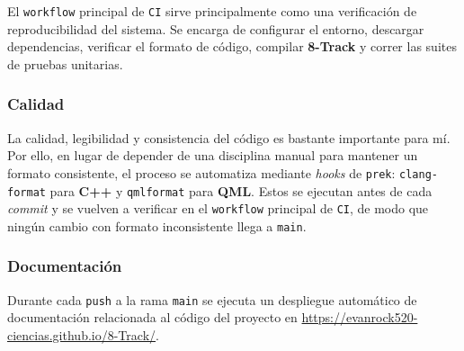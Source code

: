 El \texttt{workflow} principal de \texttt{CI} sirve principalmente como una verificación de reproducibilidad
del sistema. Se encarga de configurar el entorno, descargar dependencias, verificar el formato de código,
compilar \textbf{8-Track} y correr las suites de pruebas unitarias.

\subsubsection*{Calidad}

La calidad, legibilidad y consistencia del código es bastante importante para mí.
Por ello, en lugar de depender de una disciplina manual para mantener un formato consistente, el proceso
se automatiza mediante \textit{hooks} de \texttt{prek}: \texttt{clang-format} para \textbf{C++} y
\texttt{qmlformat} para \textbf{QML}. Estos se ejecutan antes de cada \textit{commit} y se vuelven a verificar
en el \texttt{workflow} principal de \texttt{CI}, de modo que ningún cambio con formato inconsistente llega
a \texttt{main}.


\subsubsection*{Documentación}

Durante cada \texttt{push} a la rama \texttt{main} se ejecuta un despliegue automático de documentación
relacionada al código del proyecto en \url{https://evanrock520-ciencias.github.io/8-Track/}.
